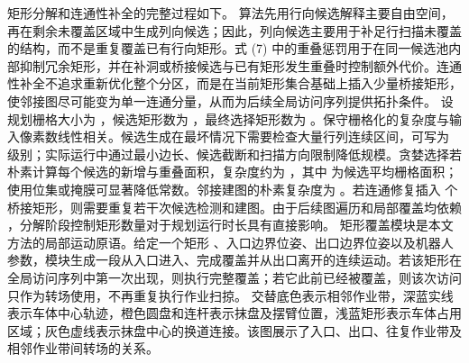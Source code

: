 {}矩形分解和连通性补全的完整过程如下。\markdownRendererParagraphSeparator
{}\markdownRendererParagraphSeparator
{}算法先用行向候选解释主要自由空间，再在剩余未覆盖区域中生成列向候选；因此，列向候选主要用于补足行扫描未覆盖的结构，而不是重复覆盖已有行向矩形。式 (7) 中的重叠惩罚用于在同一候选池内部抑制冗余矩形，并在补洞或桥接候选与已有矩形发生重叠时控制额外代价。连通性补全不追求重新优化整个分区，而是在当前矩形集合基础上插入少量桥接矩形，使邻接图尽可能变为单一连通分量，从而为后续全局访问序列提供拓扑条件。\markdownRendererParagraphSeparator
{}设规划栅格大小为 ，候选矩形数为 ，最终选择矩形数为 。保守栅格化的复杂度与输入像素数线性相关。候选生成在最坏情况下需要检查大量行列连续区间，可写为  级别；实际运行中通过最小边长、候选截断和扫描方向限制降低规模。贪婪选择若朴素计算每个候选的新增与重叠面积，复杂度约为 ，其中  为候选平均栅格面积；使用位集或掩膜可显著降低常数。邻接建图的朴素复杂度为 。若连通修复插入  个桥接矩形，则需要重复若干次候选检测和建图。由于后续图遍历和局部覆盖均依赖 ，分解阶段控制矩形数量对于规划运行时长具有直接影响。\markdownRendererParagraphSeparator
{}
\markdownRendererSectionEnd \markdownRendererSectionBegin
{}\markdownRendererParagraphSeparator
{}矩形覆盖模块是本文方法的局部运动原语。给定一个矩形 、入口边界位姿、出口边界位姿以及机器人参数，模块生成一段从入口进入、完成覆盖并从出口离开的连续运动。若该矩形在全局访问序列中第一次出现，则执行完整覆盖；若它此前已经被覆盖，则该次访问只作为转场使用，不再重复执行作业扫掠。\markdownRendererParagraphSeparator
{}\markdownRendererParagraphSeparator
{} 交替底色表示相邻作业带，深蓝实线表示车体中心轨迹，橙色圆盘和连杆表示抹盘及摆臂位置，浅蓝矩形表示车体占用区域；灰色虚线表示抹盘中心的换道连接。该图展示了入口、出口、往复作业带及相邻作业带间转场的关系。\markdownRendererParagraphSeparator
{}\markdownRendererSectionBegin
